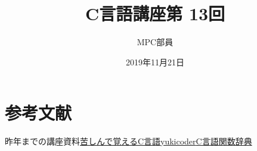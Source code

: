 \documentclass[a4j,titlepage,dvipdfmx]{jsarticle}   %
\title{C言語講座第 13回}%
\author{MPC部員}
\date{2019年11月21日}%
\newcommand{\articlepath}{./article}
\begin{document}
\maketitle




\section*{参考文献}
\noindent
[1]昨年までの講座資料\newline
[2]\href{http://9cguide.appspot.com}{苦しんで覚えるC言語}\newline
[3]\href{https://yukicoder.me/}{yukicoder}\newline
[4]\href{http://www.c-tipsref.com/reference/string.html}{C言語関数辞典}
\end{document}

